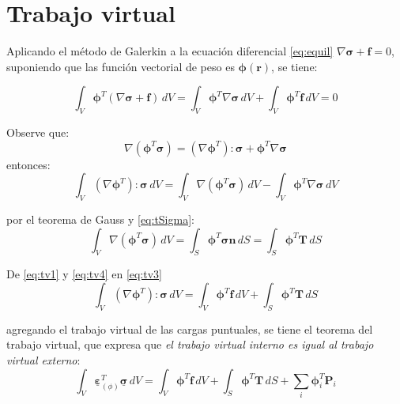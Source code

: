 \section{Trabajo virtual}

Aplicando el método de Galerkin a la ecuación diferencial \eqref{eq:equil} $\nabla \bm{\sigma} + \mathbf{f} = 0$, suponiendo que las función vectorial de peso es $\bm{\phi}(\mathbf{r})$, se tiene:

\begin{equation}
	\int_V \bm{\phi}^T \left( \nabla \bm{\sigma} + \mathbf{f} \right) \, dV = \int_V \bm{\phi}^T \nabla \bm{\sigma} \, dV + \int_V \bm{\phi}^T \mathbf{f}\, dV = 0
	\label{eq:tv1}
\end{equation}

Observe que:
\begin{equation}
	\nabla \left( \bm{\phi}^T \bm{\sigma} \right) = \left(\nabla \bm{\phi}^T\right) \colon \bm{\sigma} + \bm{\phi}^T \nabla \bm{\sigma}
	\label{eq:tv2}
\end{equation}
entonces:
\begin{equation}
	\int_V \left(\nabla \bm{\phi}^T\right) \colon \bm{\sigma}\, dV = \int_V \nabla \left( \bm{\phi}^T \bm{\sigma} \right) \, dV - \int_V \bm{\phi}^T \nabla \bm{\sigma} \, dV
	\label{eq:tv3}
\end{equation}

por el teorema de Gauss y \eqref{eq:tSigma}:
\begin{equation}
	\int_V \nabla \left( \bm{\phi}^T \bm{\sigma} \right) \, dV = \int_S \bm{\phi}^T \bm{\sigma} \mathbf{n}\, dS = \int_S \bm{\phi}^T \mathbf{T} \, dS
	\label{eq:tv4}
\end{equation}

De \eqref{eq:tv1} y \eqref{eq:tv4} en \eqref{eq:tv3}
\begin{equation}
	\int_V \left(\nabla \bm{\phi}^T\right) \colon \bm{\sigma}\, dV = \int_V \bm{\phi}^T \mathbf{f}\, dV + \int_S \bm{\phi}^T \mathbf{T} \, dS
	\label{eq:tv5}
\end{equation}

agregando el trabajo virtual de las cargas puntuales, se tiene el teorema del trabajo virtual, que expresa que \textit{el trabajo virtual interno es igual al trabajo virtual externo}:
\begin{equation}
	\boxed{\int_V \underline{\bm{\varepsilon}}^T_{(\phi)} \underline{\bm{\sigma}} \, dV = \int_V \bm{\phi}^T \mathbf{f}\, dV + \int_S \bm{\phi}^T \mathbf{T} \, dS + \sum_i \bm{\phi}^T_i \mathbf{P}_i}
	\label{eq:tv6}
\end{equation}


